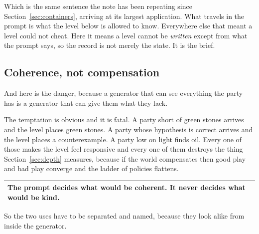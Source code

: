 \documentclass[11pt,a4paper]{article}
\begin{document}
\begin{sectionbox}
Which is the same sentence the note has been repeating since Section~\ref{sec:containers}, arriving
at its largest application. What travels in the prompt is what the level below is allowed to know.
Everywhere else that meant a level could not cheat. Here it means a level cannot be \emph{written}
except from what the prompt says, so the record is not merely the state. It is the brief.
\end{sectionbox}

\subsection{Coherence, not compensation}
\label{sec:coherence}

And here is the danger, because a generator that can see everything the party has is a generator
that can give them what they lack.

The temptation is obvious and it is fatal. A party short of green stones arrives and the level
places green stones. A party whose hypothesis is correct arrives and the level places a
counterexample. A party low on light finds oil. Every one of those makes the level feel
responsive and every one of them destroys the thing Section~\ref{sec:depth} measures, because if
the world compensates then good play and bad play converge and the ladder of policies flattens.

\begin{center}
\begin{tabular}{@{}>{\raggedright\arraybackslash}p{}@{}}
\toprule
\textbf{The prompt decides what would be coherent. It never decides what would be kind.} \\
\bottomrule
\end{tabular}
\end{center}

So the two uses have to be separated and named, because they look alike from inside the generator.
\end{document}
